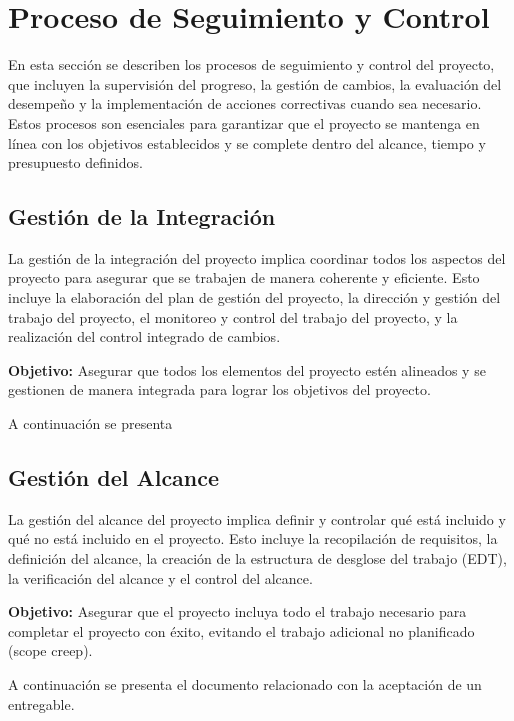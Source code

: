 \section{Proceso de Seguimiento y Control} 

  En esta sección se describen los procesos de seguimiento y control del proyecto, que incluyen la supervisión del progreso, la gestión de cambios, la evaluación del desempeño y la implementación de acciones correctivas cuando sea necesario. Estos procesos son esenciales para garantizar que el proyecto se mantenga en línea con los objetivos establecidos y se complete dentro del alcance, tiempo y presupuesto definidos.

  \subsection{Gestión de la Integración}

    La gestión de la integración del proyecto implica coordinar todos los aspectos del proyecto para asegurar que se trabajen de manera coherente y eficiente. Esto incluye la elaboración del plan de gestión del proyecto, la dirección y gestión del trabajo del proyecto, el monitoreo y control del trabajo del proyecto, y la realización del control integrado de cambios.

    \textbf{Objetivo:} Asegurar que todos los elementos del proyecto estén alineados y se gestionen de manera integrada para lograr los objetivos del proyecto.

    A continuación se presenta 



\subsection{Gestión del Alcance}

    La gestión del alcance del proyecto implica definir y controlar qué está incluido y qué no está incluido en el proyecto. Esto incluye la recopilación de requisitos, la definición del alcance, la creación de la estructura de desglose del trabajo (EDT), la verificación del alcance y el control del alcance.

    \textbf{Objetivo:} Asegurar que el proyecto incluya todo el trabajo necesario para completar el proyecto con éxito, evitando el trabajo adicional no planificado (scope creep).

    A continuación se presenta el documento relacionado con la aceptación de un entregable.

